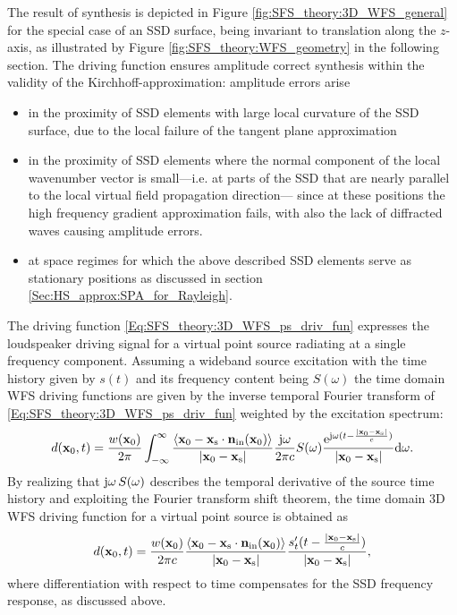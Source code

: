 The result of synthesis is depicted in Figure \ref{fig:SFS_theory:3D_WFS_general} for the special case of an SSD surface, being invariant to translation along the $z$-axis, as illustrated by Figure \ref{fig:SFS_theory:WFS_geometry} in the following section.
The driving function ensures amplitude correct synthesis within the validity of the Kirchhoff-approximation:
amplitude errors arise 
\begin{itemize}
\item in the proximity of SSD elements with large local curvature of the SSD surface, due to the local failure of the tangent plane approximation
\item in the proximity of SSD elements where the normal component of the local wavenumber vector is small---i.e. at parts of the SSD that are nearly parallel to the local virtual field propagation direction--- since at these positions the high frequency gradient approximation fails, with also the lack of diffracted waves causing amplitude errors.
\item at space regimes for which the above described SSD elements serve as stationary positions as discussed in section \ref{Sec:HS_approx:SPA_for_Rayleigh}.
\end{itemize}

The driving function \eqref{Eq:SFS_theory:3D_WFS_ps_driv_fun} expresses the loudspeaker driving signal for a virtual point source radiating at a single frequency component.
Assuming a wideband source excitation with the time history given by $s(t)$ and its frequency content being $S(\omega)$ the time domain WFS driving functions are given by the inverse temporal Fourier transform of \eqref{Eq:SFS_theory:3D_WFS_ps_driv_fun} weighted by the excitation spectrum:
\begin{equation}
d(\mathbf{x}_0,t) = \frac{w(\mathbf{x}_0)}{2\pi} \int_{-\infty}^{\infty} \frac{\left< \mathbf{x}_0-\mathbf{x}_{\mathrm{s}} \cdot \mathbf{n}_{\mathrm{in}}(\mathbf{x}_0) \right> }{|\mathbf{x}_0-\mathbf{x}_{\mathrm{s}}|} \frac{\mathrm{j} \omega }{2\pi c} S(\omega) \frac{\mathrm{e}^{ \mathrm{j} \omega ( t - \frac{|\mathbf{x}_0-\mathbf{x}_{\mathrm{s}}|}{c} ) }}{|\mathbf{x}_0-\mathbf{x}_{\mathrm{s}}|} 
\mathrm{d} \omega.
\end{equation}
By realizing that $\mathrm{j} \omega \, S(\omega)$ describes the temporal derivative of the source time history  and exploiting the Fourier transform shift theorem, the time domain 3D WFS driving function for a virtual point source is obtained as
\begin{equation}
\label{Eq:SFS_theory:3D_WFS_ps_driv_fun_td}
d(\mathbf{x}_0,t) = \frac{w(\mathbf{x}_0)}{2\pi c} \frac{\left< \mathbf{x}_0-\mathbf{x}_{\mathrm{s}} \cdot \mathbf{n}_{\mathrm{in}}(\mathbf{x}_0) \right> }{|\mathbf{x}_0-\mathbf{x}_{\mathrm{s}}|} \frac{s'_t(t - \frac{|\mathbf{x}_0-\mathbf{x}_{\mathrm{s}}|}{c} )}{|\mathbf{x}_0-\mathbf{x}_{\mathrm{s}}|},
\end{equation}
where differentiation with respect to time compensates for the SSD frequency response, as discussed above.

